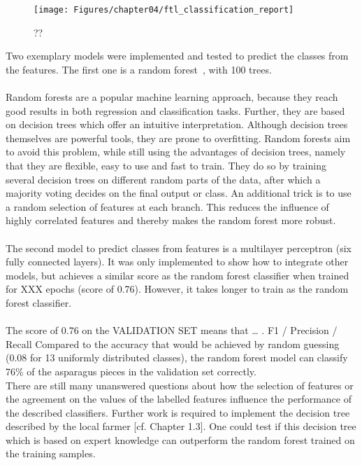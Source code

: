 \begin{figure}[h]
	\centering
	\texttt{[image: Figures/chapter04/ftl\_classification\_report]}
	\decoRule
	\caption[??]{??}
	\label{fig:FeatureToLabelReport}
\end{figure}


Two exemplary models were implemented and tested to predict the classes from the features. The first one is a random forest~\citep{breiman2001random}, with 100 trees. \\
\\
Random forests are a popular machine learning approach, because they reach good results in both regression and classification tasks. Further, they are based on decision trees which offer an intuitive interpretation. Although decision trees themselves are powerful tools, they are prone to overfitting. Random forests aim to avoid this problem, while still using the advantages of decision trees, namely that they are flexible, easy to use and fast to train. They do so by training several decision trees on different random parts of the data, after which a majority voting decides on the final output or class. An additional trick is to use a random selection of features at each branch. This reduces the influence of highly correlated features and thereby makes the random forest more robust. \\
\\
The second model to predict classes from features is a multilayer perceptron (six fully connected layers). It was only implemented to show how to integrate other models, but achieves a similar score as the random forest classifier when trained for XXX epochs (score of 0.76). However, it takes longer to train as the random forest classifier. \\
\\
The score of 0.76 on the VALIDATION SET means that  … . F1 / Precision / Recall Compared to the accuracy that would be achieved by random guessing (0.08 for 13 uniformly distributed classes), the random forest model can classify 76\% of the asparagus pieces in the validation set correctly. \\
There are still many unanswered questions about how the selection of features or the agreement on the values of the labelled features influence the performance of the described classifiers. Further work is required to implement the decision tree described by the local farmer [cf. Chapter 1.3]. One could test if this decision tree which is based on expert knowledge can outperform the random forest trained on the training samples. 



